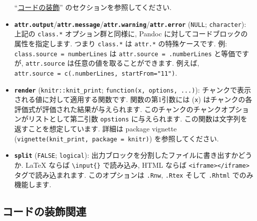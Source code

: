 \documentclass[
  lualatex,ja=standard,jafont=noto-otf]{bxjsreport}
\begin{document}
\begin{itemize}
  ``\protect\hyperlink{code-decoration}{コードの装飾}''
  のセクションを参照してください.
\item
  \textbf{\texttt{attr.output}}/\textbf{\texttt{attr.message}}/\textbf{\texttt{attr.warning}}/\textbf{\texttt{attr.error}}
  (\texttt{NULL}; \texttt{character}): 上記の \texttt{class.*}
  オプション群と同様に, Pandoc に対してコードブロックの属性を指定します.
  つまり \texttt{class.*} は \texttt{attr.*} の特殊ケースです. 例:
  \texttt{class.source\ =\ \textquotesingle{}numberLines\textquotesingle{}}
  は
  \texttt{attr.source\ =\ \textquotesingle{}.numberLines\textquotesingle{}}
  と等価ですが, \texttt{attr.source} は任意の値を取ることができます.
  例えば,
  \texttt{attr.source\ =\ c(\textquotesingle{}.numberLines\textquotesingle{},\ \textquotesingle{}startFrom="11"\textquotesingle{})}.
\item
  \textbf{\texttt{render}} (\texttt{knitr::knit\_print};
  \texttt{function(x,\ options,\ ...)}):
  チャンクで表示される値に対して適用する関数です. 関数の第1引数には
  (\texttt{x}) はチャンクの各評価式が評価された結果が与えられます.
  このチャンクのチャンクオプションがリストとして第二引数
  \texttt{opstions} に与えられます.
  この関数は文字列を返すことを想定しています. 詳細は package vignette
  (\texttt{vignette(\textquotesingle{}knit\_print\textquotesingle{},\ package\ =\ \textquotesingle{}knitr\textquotesingle{})})
  を参照してください.
\item
  \textbf{\texttt{split}} (\texttt{FALSE}; \texttt{logical}):
  出力ブロックを分割したファイルに書き出すかどうか. LaTeX ならば
  \texttt{\textbackslash{}input\{\}} で読み込み, HTML ならば
  \texttt{\textless{}iframe\textgreater{}\textless{}/iframe\textgreater{}}
  タグで読み込まれます. このオプションは \texttt{.Rnw}, \texttt{.Rtex}
  そして \texttt{.Rhtml} でのみ機能します.
\end{itemize}

\hypertarget{code-decoration}{%
\subsection{コードの装飾関連}\label{code-decoration}}
\end{document}
